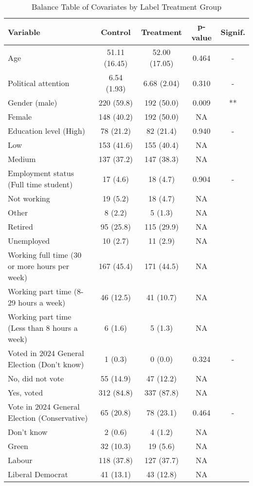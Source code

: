 \begin{table}
\centering
\caption{Balance Table of Covariates by Label Treatment Group}
\centering
\fontsize{10}{12}\selectfont
\begin{threeparttable}
\begin{tabular}[t]{lcccc}
\toprule
Variable & Control & Treatment & p-value & Signif.\\
\midrule
Age & 51.11 (16.45) & 52.00 (17.05) & 0.464 & -\\
Political attention & 6.54 (1.93) & 6.68 (2.04) & 0.310 & -\\
Gender (male) & 220 (59.8) & 192 (50.0) & 0.009 & **\\
Female & 148 (40.2) & 192 (50.0) & NA & \\
Education level (High) & 78 (21.2) & 82 (21.4) & 0.940 & -\\
\addlinespace
Low & 153 (41.6) & 155 (40.4) & NA & \\
Medium & 137 (37.2) & 147 (38.3) & NA & \\
Employment status (Full time student) & 17 (4.6) & 18 (4.7) & 0.904 & -\\
Not working & 19 (5.2) & 18 (4.7) & NA & \\
Other & 8 (2.2) & 5 (1.3) & NA & \\
\addlinespace
Retired & 95 (25.8) & 115 (29.9) & NA & \\
Unemployed & 10 (2.7) & 11 (2.9) & NA & \\
Working full time (30 or more hours per week) & 167 (45.4) & 171 (44.5) & NA & \\
Working part time (8-29 hours a week) & 46 (12.5) & 41 (10.7) & NA & \\
Working part time (Less than 8 hours a week) & 6 (1.6) & 5 (1.3) & NA & \\
\addlinespace
Voted in 2024 General Election (Don't know) & 1 (0.3) & 0 (0.0) & 0.324 & -\\
No, did not vote & 55 (14.9) & 47 (12.2) & NA & \\
Yes, voted & 312 (84.8) & 337 (87.8) & NA & \\
Vote in 2024 General Election (Conservative) & 65 (20.8) & 78 (23.1) & 0.464 & -\\
Don't know & 2 (0.6) & 4 (1.2) & NA & \\
\addlinespace
Green & 32 (10.3) & 19 (5.6) & NA & \\
Labour & 118 (37.8) & 127 (37.7) & NA & \\
Liberal Democrat & 41 (13.1) & 43 (12.8) & NA & \\

\end{tabular}
\end{threeparttable}
\end{table}
